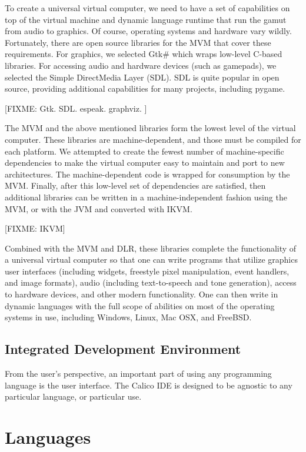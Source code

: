 \documentclass[preprint]{sigplanconf}
\begin{document}
To create a universal virtual computer, we need to have a set of capabilities on top of the virtual machine and dynamic language runtime that run the gamut from audio to graphics. Of course, operating systems and hardware vary wildly. Fortunately, there are open source libraries for the MVM that cover these requirements. For graphics, we selected Gtk\# which wraps low-level C-based libraries. For accessing audio and hardware devices (such as gamepads), we selected the Simple DirectMedia Layer (SDL). SDL is quite popular in open source, providing additional capabilities for many projects, including pygame.


[FIXME: Gtk. SDL. espeak. graphviz. ]


The MVM and the above mentioned libraries form the lowest level of the virtual computer. These libraries are machine-dependent, and those must be compiled for each platform. We attempted to create the fewest number of machine-specific dependencies to make the virtual computer easy to maintain and port to new architectures. The machine-dependent code is wrapped for consumption by the MVM. Finally, after this low-level set of dependencies are satisfied, then additional libraries can be written in a machine-independent fashion using the MVM, or with the JVM and converted with IKVM. 


[FIXME: IKVM]


Combined with the MVM and DLR, these libraries complete the functionality of a universal virtual computer so that one can write programs that utilize graphics user interfaces (including widgets, freestyle pixel manipulation, event handlers, and image formats), audio (including text-to-speech and tone generation), access to hardware devices, and other modern functionality. One can then write in dynamic languages with the full scope of abilities on most of the operating systems in use, including Windows, Linux, Mac OSX, and FreeBSD. 


\subsection{Integrated Development Environment}


From the user's perspective, an important part of using any programming language is the user interface. The Calico IDE is designed to be agnostic to any particular language, or particular use. 


\section{Languages}
\end{document}
